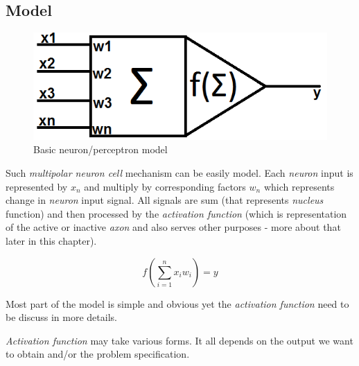\newpage
\subsection{Model}

\begin{figure}[!h]
    \centering
    \includegraphics[scale=0.5]{Media/Neuron.png}
    \caption{Basic neuron/perceptron model}
    \label{fig:NeuronModel}
\end{figure}

Such \textit{multipolar neuron cell} mechanism can be easily model. Each \textit{neuron} input is represented by $x_n$ and multiply by corresponding factors $w_n$ which represents change in \textit{neuron} input signal. All signals are sum (that represents \textit{nucleus} function) and then processed by the \textit{activation function} (which is representation of the active or inactive \textit{axon} and also serves other purposes - more about that later in this chapter).

\begin{mycapequ}[!ht]
    $$f\left(\sum\limits_{i=1}^n x_iw_i\right) = y$$
    \caption{Basic neuron/perceptron model}
    \label{formula:neuron}
\end{mycapequ}

Most part of the model is simple and obvious yet the \textit{activation function} need to be discuss in more details.

\textit{Activation function} may take various forms. It all depends on the output we want to obtain and/or the problem specification. 